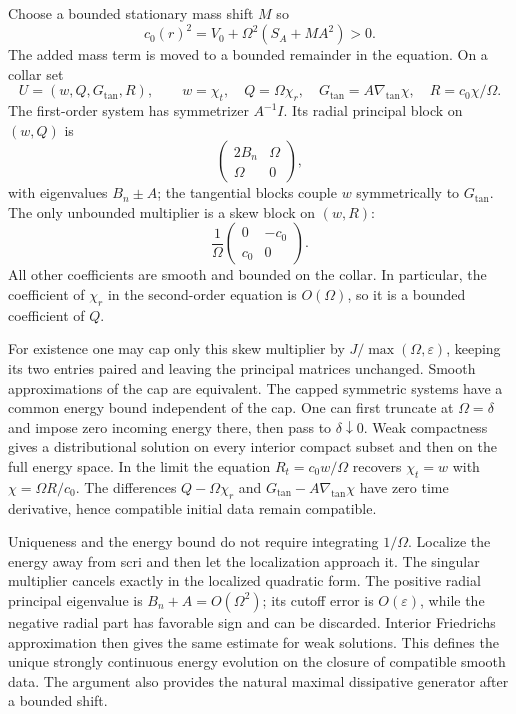 Choose a bounded stationary mass shift $M$ so
\[
 c_0(r)^2=V_0+\Omega^2(S_A+MA^2)>0.
\]
The added mass term is moved to a bounded remainder in the equation. On a collar set
\[
 U=(w,Q,G_{\tan},R),\qquad
 w=\chi_t,\quad Q=\Omega\chi_r,\quad
 G_{\tan}=A\nabla_{\tan}\chi,\quad R=c_0\chi/\Omega.
\]
The first-order system has symmetrizer $A^{-1}I$. Its radial principal block on $(w,Q)$ is
\[
 \begin{pmatrix}2B_n&\Omega\\\Omega&0\end{pmatrix},
\]
with eigenvalues $B_n\pm A$; the tangential blocks couple $w$ symmetrically to $G_{\tan}$. The only unbounded multiplier is a skew block on $(w,R)$:
\[
 \frac1\Omega\begin{pmatrix}0&-c_0\\c_0&0\end{pmatrix}.
\]
All other coefficients are smooth and bounded on the collar. In particular, the coefficient of $\chi_r$ in the second-order equation is $O(\Omega)$, so it is a bounded coefficient of $Q$.

For existence one may cap only this skew multiplier by $J/\max(\Omega,\varepsilon)$, keeping its two entries paired and leaving the principal matrices unchanged. Smooth approximations of the cap are equivalent. The capped symmetric systems have a common energy bound independent of the cap. One can first truncate at $\Omega=\delta$ and impose zero incoming energy there, then pass to $\delta\downarrow0$. Weak compactness gives a distributional solution on every interior compact subset and then on the full energy space. In the limit the equation $R_t=c_0w/\Omega$ recovers $\chi_t=w$ with $\chi=\Omega R/c_0$. The differences $Q-\Omega\chi_r$ and $G_{\tan}-A\nabla_{\tan}\chi$ have zero time derivative, hence compatible initial data remain compatible.

Uniqueness and the energy bound do not require integrating $1/\Omega$. Localize the energy away from scri and then let the localization approach it. The singular multiplier cancels exactly in the localized quadratic form. The positive radial principal eigenvalue is $B_n+A=O(\Omega^2)$; its cutoff error is $O(\varepsilon)$, while the negative radial part has favorable sign and can be discarded. Interior Friedrichs approximation then gives the same estimate for weak solutions. This defines the unique strongly continuous energy evolution on the closure of compatible smooth data. The argument also provides the natural maximal dissipative generator after a bounded shift.

